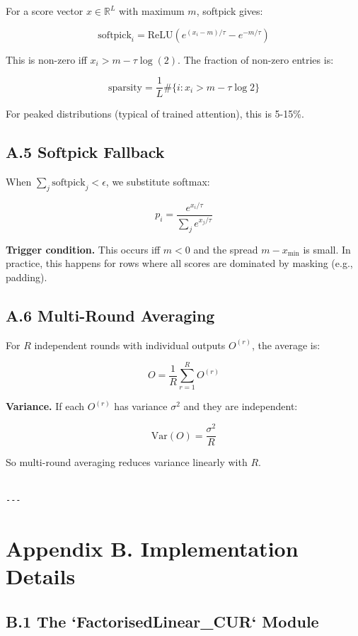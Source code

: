 For a score vector $x \in \mathbb{R}^L$ with maximum $m$, softpick gives:

\[
\text{softpick}_i = \text{ReLU}(e^{(x_i - m)/\tau} - e^{-m/\tau})
\tag{A.5}
\]

This is non-zero iff $x_i > m - \tau \log(2)$. The fraction of non-zero 
entries is:

\[
\text{sparsity} = \frac{1}{L} \#\{i : x_i > m - \tau \log 2\}
\tag{A.6}
\]

For peaked distributions (typical of trained attention), this is 5-15\%.

\subsection{A.5 Softpick Fallback}

When $\sum_j \text{softpick}_j < \epsilon$, we substitute softmax:

\[
p_i = \frac{e^{x_i / \tau}}{\sum_j e^{x_j / \tau}}
\tag{A.7}
\]

\textbf{Trigger condition.} This occurs iff $m < 0$ and the spread 
$m - x_\text{min}$ is small. In practice, this happens for rows where all 
scores are dominated by masking (e.g., padding).

\subsection{A.6 Multi-Round Averaging}

For $R$ independent rounds with individual outputs $O^{(r)}$, the average 
is:

\[
O = \frac{1}{R} \sum_{r=1}^{R} O^{(r)}
\tag{A.8}
\]

\textbf{Variance.} If each $O^{(r)}$ has variance $\sigma^2$ and they are 
independent:

\[
\mathrm{Var}(O) = \frac{\sigma^2}{R}
\tag{A.9}
\]

So multi-round averaging reduces variance linearly with $R$.
\begin{lstlisting}

---
\end{lstlisting}


\section{Appendix B. Implementation Details}

\subsection{B.1 The `FactorisedLinear\_CUR` Module}

